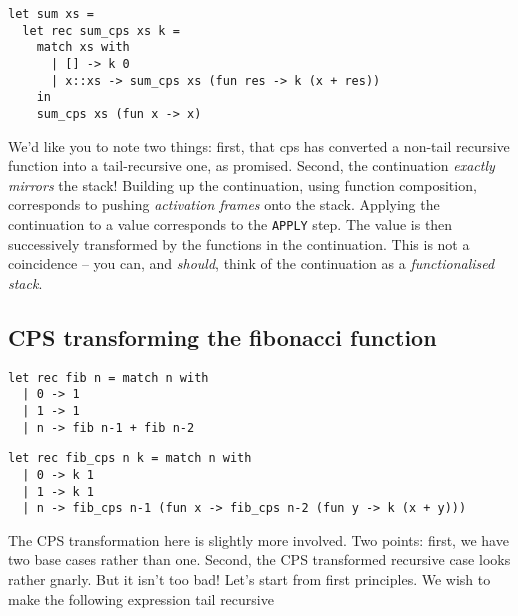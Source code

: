 \begin{code}
\label{code:sum-cps-wrapped-ocaml}
\begin{verbatim}
let sum xs = 
  let rec sum_cps xs k = 
    match xs with
      | [] -> k 0
      | x::xs -> sum_cps xs (fun res -> k (x + res))
    in
    sum_cps xs (fun x -> x)
\end{verbatim}
\end{code}

We'd like you to note two things: first, that cps has converted a non-tail recursive function into a tail-recursive one, as promised. Second, the continuation \emph{exactly mirrors} the stack! Building up the continuation, using function composition, corresponds to pushing \emph{activation frames} onto the stack. Applying the continuation to a value corresponds to the \texttt{APPLY} step. The value is then successively transformed by the functions in the continuation. This is not a coincidence -- you can, and \emph{should}, think of the continuation as a \emph{functionalised stack}. 

\subsection{CPS transforming the fibonacci function}
\label{subsection:cps-fib}
\begin{code}
\label{code:fib-ocaml-again}
\begin{verbatim}
let rec fib n = match n with
  | 0 -> 1
  | 1 -> 1
  | n -> fib n-1 + fib n-2
\end{verbatim}
\end{code}

\begin{code}
\label{code:fib-ocaml-again}
\begin{verbatim}
let rec fib_cps n k = match n with
  | 0 -> k 1
  | 1 -> k 1
  | n -> fib_cps n-1 (fun x -> fib_cps n-2 (fun y -> k (x + y)))
\end{verbatim}
\end{code}

The CPS transformation here is slightly more involved. Two points: first, we have two base cases rather than one. Second, the CPS transformed recursive case looks rather gnarly. But it isn't too bad! Let's start from first principles. We wish to make the following expression tail recursive 

